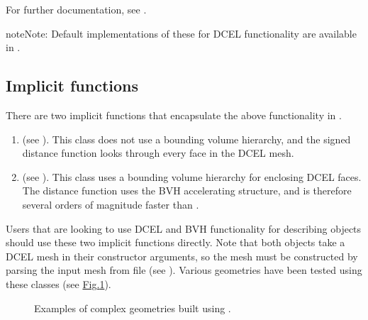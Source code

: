 \documentclass[letterpaper,10pt,english]{sphinxmanual}
\let\sphinxpxdimen\pdfpxdimen\else\newdimen\sphinxpxdimen
\begin{document}
For further documentation, see .

\begin{sphinxadmonition}{note}{Note:}
Default implementations of these for DCEL functionality are available in .
\end{sphinxadmonition}


\subsection{Implicit functions}
\label{\detokenize{Utilities/ComplexGeometries:implicit-functions}}
There are two implicit functions that encapsulate the above functionality in .
\begin{enumerate}
%
\item {} 
 (see ).
This class does not use a bounding volume hierarchy, and the signed distance function looks through every face in the DCEL mesh.

\item {} 
 (see ).
This class uses a bounding volume hierarchy for enclosing DCEL faces.
The distance function uses the BVH accelerating structure, and is therefore several orders of magnitude faster than .

\end{enumerate}

Users that are looking to use DCEL and BVH functionality for describing objects should use these two implicit functions directly.
Note that both objects take a DCEL mesh in their constructor arguments, so the mesh must be constructed by parsing the input mesh from file (see {\hyperref[\detokenize{Utilities/ComplexGeometries:chap-dcelparser}]{}}).
Various geometries have been tested using these classes (see \hyperref[\detokenize{Utilities/ComplexGeometries:fig-plyobjects}]{Fig.\@ \ref{\detokenize{Utilities/ComplexGeometries:fig-plyobjects}}}).

\begin{figure}[htb]
\centering
\capstart

\noindent\sphinxincludegraphics[width=480\sphinxpxdimen]{{PLYObjects}.png}
\caption{Examples of complex geometries built using .}\label{\detokenize{Utilities/ComplexGeometries:id7}}\label{\detokenize{Utilities/ComplexGeometries:fig-plyobjects}}\end{figure}
\end{document}
